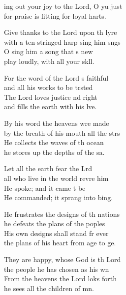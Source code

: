 \settowidth{\versewidth}{Ring out your joy to the Lord, O you just *}
\begin{psalmverse}%
  \begin{patverse}
    ing out your joy to the Lord, O yu just\Med\\
    for praise is fitting for loyal harts.

Give thanks to the Lord upon th lyre\Med\\
    with a ten-stringed harp sing him sngs\\
O sing him a song that \pointup{\i}s new\Med\\
    play loudly, with all your sk\pointup{\i}ll.

For the word of the Lord \pointup{\i}s faithful\Med\\
    and all his works to be trsted\\
The Lord loves justice nd right\Med\\
    and fills the earth with his lve.

By his word the heavens wre made\Med\\
    by the breath of his mouth all the strs\\
He collects the waves of th ocean\Med\\
    he stores up the depths of the sa.

Let all the earth fear the Lrd\Med\\
    all who live in the world revre him\\
He spoke; and it came t be\Med\\
    He commanded; it sprang into bing.

He frustrates the designs of th nations\Med\\
    he defeats the plans of the poples\\
His own designs shall stand fr ever\Med\\
    the plans of his heart from age to ge.

They are happy, whose God is th Lord\Med\\
    the people he has chosen as his wn\\
From the heavens the Lord loks forth\Med\\
    he sees all the children of mn.


\end{patverse}
\end{psalmverse}
